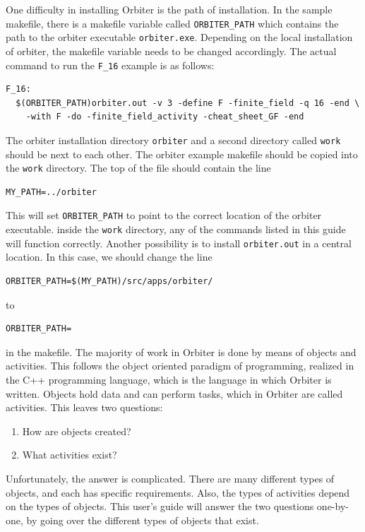 One difficulty in installing Orbiter is the path of installation.
In the sample makefile, there is a makefile variable called 
\verb'ORBITER_PATH' which contains the path to the orbiter executable \verb'orbiter.exe'.
Depending on the local installation of orbiter, 
the makefile variable needs to be changed accordingly. 
The actual command to run the \verb'F_16' example is as follows:
\begin{verbatim}
F_16:
  $(ORBITER_PATH)orbiter.out -v 3 -define F -finite_field -q 16 -end \
    -with F -do -finite_field_activity -cheat_sheet_GF -end
\end{verbatim}
The orbiter installation directory \verb'orbiter' 
and a second directory called \verb'work' should be next to each other. 
The orbiter example makefile should be copied into the \verb'work' directory. 
The top of the file should contain the line
\begin{verbatim}
MY_PATH=../orbiter
\end{verbatim}
This will set \verb'ORBITER_PATH' to point to the correct location of the orbiter executable. 
inside the \verb'work' directory, any of the commands listed in this guide will function correctly.
Another possibility is to install \verb'orbiter.out' in a central location. 
In this case, we should change the line 
\begin{verbatim}
ORBITER_PATH=$(MY_PATH)/src/apps/orbiter/
\end{verbatim}
to
\begin{verbatim}
ORBITER_PATH=
\end{verbatim}
in the makefile.
The majority of work in Orbiter is done by means of objects and activities. 
This follows the object oriented paradigm of programming, 
realized in the C++ programming language, which is the language in which Orbiter is written. 
Objects hold data and can perform tasks, which in Orbiter are called activities. 
This leaves two questions: 
\begin{enumerate}
\item
How are objects created?
\item
What activities exist?
\end{enumerate}
Unfortunately, the answer is complicated. 
There are many different types of objects, and each has specific requirements. 
Also, the types of activities depend on the types of objects.
This user's guide will answer the two questions one-by-one, by going over the different types of objects that exist. 


\bigskip


